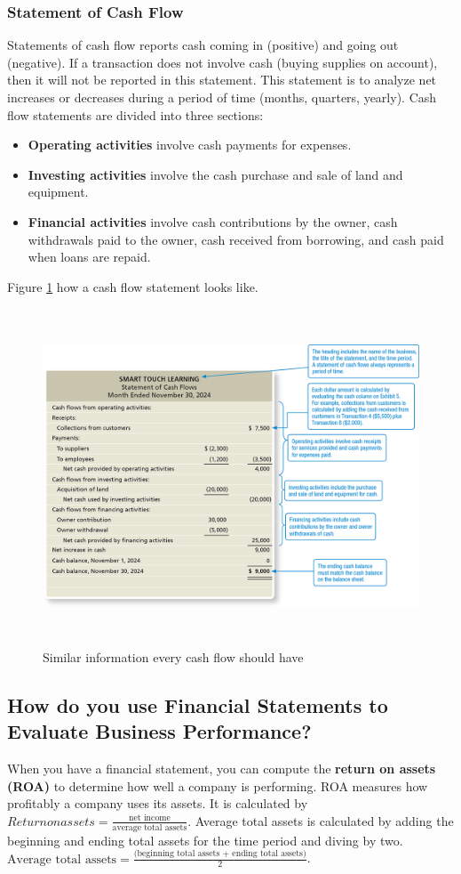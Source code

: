 \documentclass[a4paper, 12pt]{article}
\begin{document}
\subsubsection{Statement of Cash Flow}
Statements of cash flow reports cash coming in (positive) and going out (negative).
If a transaction does not involve cash (buying supplies on account), then it
will not be reported in this statement. This statement is to analyze net
increases or decreases during a period of time (months, quarters, yearly).
Cash flow statements are divided into three sections:
\begin{itemize}
    \item \textbf{Operating activities} involve cash payments for expenses.
    \item \textbf{Investing activities} involve the cash purchase and sale of
        land and equipment.
    \item \textbf{Financial activities} involve cash contributions by the owner,
        cash withdrawals paid to the owner, cash received from borrowing, and
        cash paid when loans are repaid.
\end{itemize}
Figure \ref{fig:cash_flow} how a cash flow statement looks like.
\begin{figure}
    \centering
    \includegraphics[height=10cm, width=13cm]{cash_flow.png}
    \caption{Similar information every cash flow should have}
    \label{fig:cash_flow}
\end{figure}

\subsection{How do you use Financial Statements to Evaluate Business Performance?}
When you have a financial statement, you can compute the \textbf{return on assets
(ROA)} to determine how well a company is performing. ROA measures how
profitably a company uses its assets. It is calculated by $Return on assets = 
\frac{\text{net income}} {\text{average total assets}}$. Average total assets is
calculated by adding the beginning and ending total assets for the time period
and diving by two.
$\text{Average total assets} = \frac{\text{(beginning total assets + ending total
assets)}}{2}$.
\end{document}
